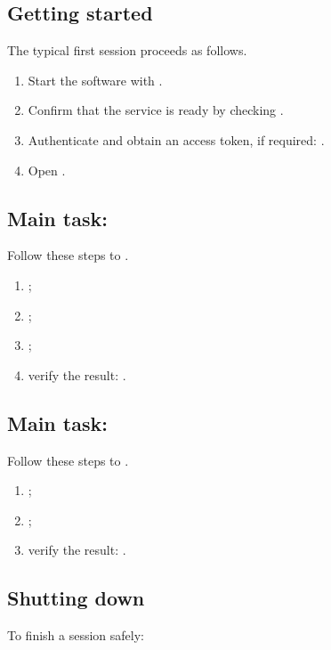 \documentclass[12pt,a4paper]{extarticle}
\begin{document}
\subsection{Getting started}
The typical first session proceeds as follows.

\begin{enumerate}[label=\arabic*., leftmargin=1.25cm]
    \item Start the software with \texttt{}.
    \item Confirm that the service is ready by checking .
    \item Authenticate and obtain an access token, if required: .
    \item Open .
\end{enumerate}

\subsection{Main task: }
Follow these steps to .

\begin{enumerate}[label=\arabic*., leftmargin=1.25cm]
    \item {};
    \item {};
    \item {};
    \item verify the result: .
\end{enumerate}

\subsection{Main task: }
Follow these steps to .

\begin{enumerate}[label=\arabic*., leftmargin=1.25cm]
    \item {};
    \item {};
    \item verify the result: .
\end{enumerate}

\subsection{Shutting down}
To finish a session safely:
\end{document}
